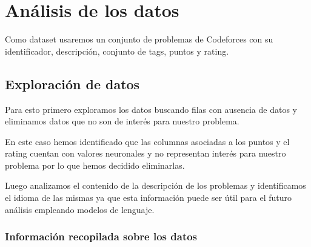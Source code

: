 \documentclass{article}
\begin{document}
\section{Análisis de los datos}

Como dataset usaremos un conjunto de problemas de Codeforces con su identificador, descripción, conjunto de tags, puntos y rating. 

\subsection{Exploración de datos}

Para esto primero exploramos los datos buscando filas con ausencia de datos y eliminamos datos que no son de interés para
nuestro problema. 

En este caso hemos identificado que las columnas asociadas a los puntos y el rating cuentan con valores neuronales
y no representan interés para nuestro problema por lo que hemos decidido eliminarlas.

Luego analizamos el contenido de la descripción de los problemas y identificamos el idioma de las mismas ya que esta
información puede ser útil para el futuro análisis empleando modelos de lenguaje.

\subsubsection{Información recopilada sobre los datos}
\end{document}
